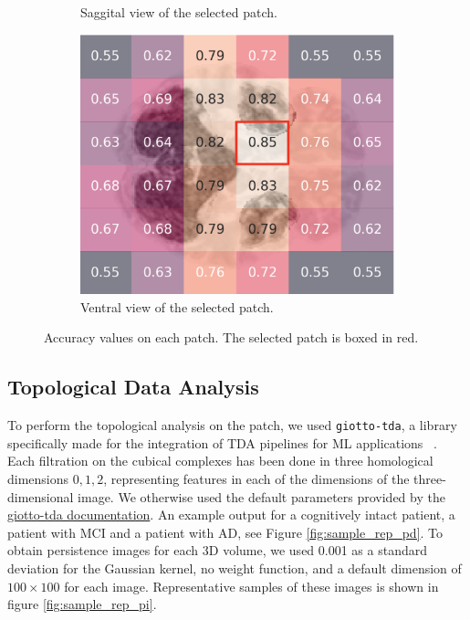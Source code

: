 \documentclass{article}
\begin{document}
\begin{figure}[b]
\begin{subfigure}{0.32\textwidth}
    \caption{Saggital view of the selected patch.}
  \end{subfigure}
  \hfill
  \begin{subfigure}{0.32\textwidth}
    \includegraphics[width=\textwidth]{figures/perf_ventral.png}
    \caption{Ventral view of the selected patch.}
  \end{subfigure}
  \caption{Accuracy values on each patch. The selected patch is boxed in red.}
  \label{fig:acc}
\end{figure}

\subsection{Topological Data Analysis}\label{sec:tda_setup}

To perform the topological analysis on the patch, we used \texttt{giotto-tda}, a library
specifically made for the integration of TDA pipelines for ML applications ~\citep{tauzin2020giottotda}. Each
filtration on the cubical complexes has been done in three homological dimensions $0,1,2$,
representing features in each of the dimensions of the three-dimensional image. We otherwise used
the default parameters provided by the
\href{https://giotto-ai.github.io/gtda-docs/latest/modules/generated/homology/gtda.homology.CubicalPersistence.html#id2}{giotto-tda
  documentation}. An example output for a cognitively intact patient, a patient with MCI and a
patient with AD, see Figure \ref{fig:sample_rep_pd}. To obtain persistence images for each 3D
volume, we used 0.001 as a standard deviation for the Gaussian kernel, no weight function, and a
default dimension of $100 \times 100$ for each image. Representative samples of these images is
shown in figure \ref{fig:sample_rep_pi}.
\end{document}
